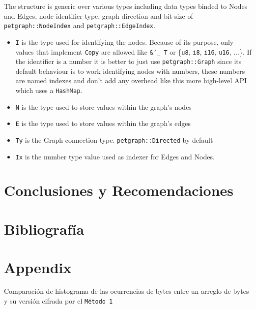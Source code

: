 The structure is generic over various types including data types binded to Nodes and Edges, node identifier type, graph direction and bit-size of
\texttt{petgraph::NodeIndex} and \texttt{petgraph::EdgeIndex}.

\begin{itemize}
 \item \texttt{I} is the type used for identifying the nodes. Because of its purpose, only values that implement
 \texttt{Copy} are allowed like \texttt{\&'\_ T} or \{\texttt{u8}, \texttt{i8}, \texttt{i16}, \texttt{u16}, ...\}. 
 If the identifier is a number it is better to just use \texttt{petgraph::Graph} since its default
 behaviour is to work identifying nodes with numbers, these numbers are named indexes and don't add any overhead
 like this more high-level API which uses a \texttt{HashMap}.
 \item \texttt{N} is the type used to store values within the graph's nodes
 \item \texttt{E} is the type used to store values within the graph's edges
 \item \texttt{Ty} is the Graph connection type. \texttt{petgraph::Directed} by default
 \item \texttt{Ix} is the number type value used as indexer for Edges and Nodes.
\end{itemize}


\newpage
\section{Conclusiones y Recomendaciones}


\newpage
\section{Bibliografía}
\printbibliography[heading=none]

\newpage
\appendix

\section{Appendix}

Comparación de histograma de las ocurrencias de bytes entre un arreglo de bytes
y su versión cifrada por el \texttt{Método 1}

